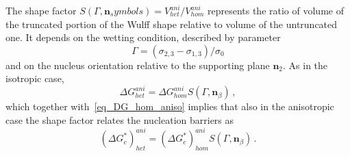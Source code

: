     The shape factor $S(\Gamma,\bm{n}_symbols)=V_{het}^{ani}/V_{hom}^{ani}$ represents the ratio of volume of the truncated portion of the Wulff shape relative to volume of the untruncated one. It depends on the wetting condition, described by parameter
    \begin{equation}
        \Gamma=(\sigma_{2,3}-\sigma_{1,3})/\sigma_{0}
    \end{equation}
    and on the nucleus orientation relative to the supporting plane $\bm{n}_\mathit{2}$. As in the isotropic case, 
    \begin{equation}
        \Delta G_{het}^{ani} = \Delta G_{hom}^{ani} S(\Gamma,\bm{n}_\beta) \,,
    \end{equation}
    which together with~\eqref{eq_DG_hom_aniso} implies that also in the anisotropic case the shape factor relates the nucleation barriers as
    \begin{equation}
        (\Delta G^*_c)_{het}^{ani} = (\Delta G^*_c)_{hom}^{ani} S(\Gamma,\bm{n}_\beta) \,.
    \end{equation}
    
    
    

